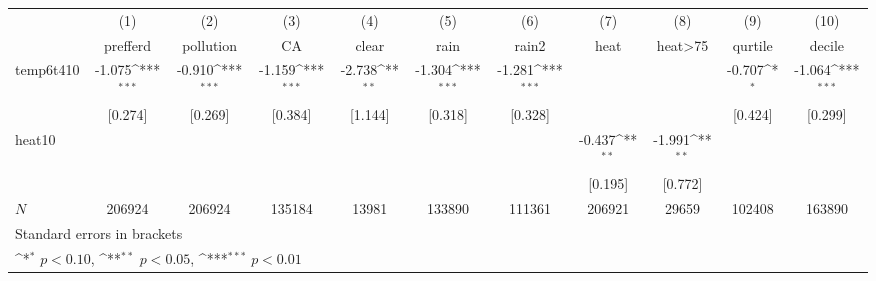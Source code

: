 {
\def\sym#1{\ifmmode^{#1}\else\(^{#1}\)\fi}
\begin{tabular}{l*{10}{c}}
\hline\hline
            &\multicolumn{1}{c}{(1)}&\multicolumn{1}{c}{(2)}&\multicolumn{1}{c}{(3)}&\multicolumn{1}{c}{(4)}&\multicolumn{1}{c}{(5)}&\multicolumn{1}{c}{(6)}&\multicolumn{1}{c}{(7)}&\multicolumn{1}{c}{(8)}&\multicolumn{1}{c}{(9)}&\multicolumn{1}{c}{(10)}\\
            &\multicolumn{1}{c}{prefferd}&\multicolumn{1}{c}{pollution}&\multicolumn{1}{c}{CA}&\multicolumn{1}{c}{clear}&\multicolumn{1}{c}{rain}&\multicolumn{1}{c}{rain2}&\multicolumn{1}{c}{heat}&\multicolumn{1}{c}{heat>75}&\multicolumn{1}{c}{qurtile}&\multicolumn{1}{c}{decile}\\
\hline
temp6t410   &      -1.075\sym{***}&      -0.910\sym{***}&      -1.159\sym{***}&      -2.738\sym{**} &      -1.304\sym{***}&      -1.281\sym{***}&                     &                     &      -0.707\sym{*}  &      -1.064\sym{***}\\
            &     [0.274]         &     [0.269]         &     [0.384]         &     [1.144]         &     [0.318]         &     [0.328]         &                     &                     &     [0.424]         &     [0.299]         \\
[1em]
heat10      &                     &                     &                     &                     &                     &                     &      -0.437\sym{**} &      -1.991\sym{**} &                     &                     \\
            &                     &                     &                     &                     &                     &                     &     [0.195]         &     [0.772]         &                     &                     \\
\hline
\(N\)       &      206924         &      206924         &      135184         &       13981         &      133890         &      111361         &      206921         &       29659         &      102408         &      163890         \\
\hline\hline
\multicolumn{11}{l}{\footnotesize Standard errors in brackets}\\
\multicolumn{11}{l}{\footnotesize \sym{*} \(p<0.10\), \sym{**} \(p<0.05\), \sym{***} \(p<0.01\)}\\
\end{tabular}
}

